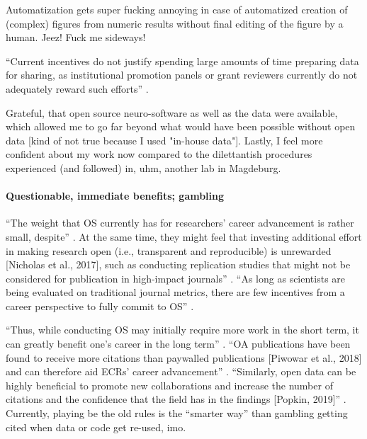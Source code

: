 %
Automatization gets super fucking annoying in case of automatized creation of
(complex) figures from numeric results without final editing of the figure by a
human.  Jeez! Fuck me sideways!



``Current incentives do not justify spending large amounts of time preparing
data for sharing, as institutional promotion panels or grant reviewers currently
do not adequately reward such efforts'' \citep{nichols2017best}.

Grateful, that open source neuro-software as well as the data were available,
which allowed me to go far beyond what would have been possible without open
data [kind of not true because I used "in-house data"].
%
Lastly, I feel more confident about my work now compared to the dilettantish
procedures experienced (and followed) in, uhm, another lab in Magdeburg.


\paragraph{Questionable, immediate benefits; gambling}


%
``The weight that OS currently has for researchers’ career advancement is rather
small, despite'' \citep{toribio2021early}.
%
At the same time, they might feel that investing additional effort in making
research open (i.e., transparent and reproducible) is unrewarded [Nicholas et
al., 2017], such as conducting replication studies that might not be considered
for publication in high-impact journals'' \citep{toribio2021early}.
%
``As long as scientists are being evaluated on traditional journal metrics,
there are few incentives from a career perspective to fully commit to OS''
\citep{toribio2021early}.


%
``Thus, while conducting OS may initially require more work in the short term,
it can greatly benefit one’s career in the long term'' \citep{toribio2021early}.
%
``OA publications have been found to receive more citations than paywalled
publications [Piwowar et al., 2018] and can therefore aid ECRs’ career
advancement'' \citep{toribio2021early}.
%
``Similarly, open data can be highly beneficial to promote new collaborations
and increase the number of citations and the confidence that the field has in
the findings [Popkin, 2019]'' \citep{toribio2021early}.
%
Currently, playing be the old rules is the ``smarter way'' than gambling getting
cited when data or code get re-used, imo.


